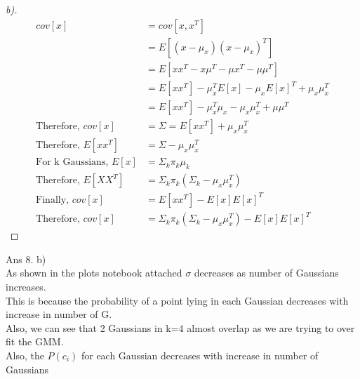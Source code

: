 \documentclass[12pt]{article}
\newenvironment{theorem}[2][Theorem]{\begin{trivlist}
\item[\hskip \labelsep {\bfseries #1}\hskip \labelsep {\bfseries #2.}]}{\end{trivlist}}
\begin{document}
\begin{theorem}[Ans]{7}
\begin{proof}[b)]
\begin{align*}
cov[x] &= cov[x,x^{T}]\\
&= E[(x-\mu_{x})(x-\mu_{x})^{T}]\\
&= E[xx^{T}-x\mu^{T}-\mu x^{T}-\mu\mu^{T}]\\
&= E[xx^{T}]-\mu_{x}^{T}E[x]-\mu_{x} E[x]^{T}+\mu_{x}\mu_{x}^{T}\\
&= E[xx^{T}]-\mu_{x}^{T}\mu_{x}-\mu_{x} \mu_{x}^{T}+\mu\mu^{T}\\
\text{Therefore, }cov[x]&=\Sigma = E[xx^{T}]+\mu_{x}\mu_{x}^{T}\\
\text{Therefore, }E[xx^{T}] &=\Sigma -\mu_{x}\mu_{x}^{T}\\
\text{For k Gaussians, }E[x] &= \Sigma _{k}\pi_{k}\mu_{k}\\ 
\text{Therefore, }E[XX^{T}] &= \Sigma _{k}\pi_{k}(\Sigma_{k} -\mu_{x}\mu_{x}^{T})\\
\text{Finally, }cov[x] &= E[xx^{T}]- E[x]E[x]^{T}\\
\text{Therefore, }cov[x] &= \Sigma _{k}\pi_{k}(\Sigma_{k} -\mu_{x}\mu_{x}^{T})- E[x]E[x]^{T}
\end{align*}
\end{proof}
\end{theorem}
Ans 8. b)\\
As shown in the plots notebook attached $\sigma$ decreases as number of Gaussians increases. \\
This is because the probability of a point lying in each Gaussian decreases with increase in number of G.\\
Also, we can see that 2 Gaussians in k=4 almost overlap as we are trying to over fit the GMM.\\
Also, the $P(c_{i})$ for each Gaussian decreases with increase in number of Gaussians

 
\end{document}

